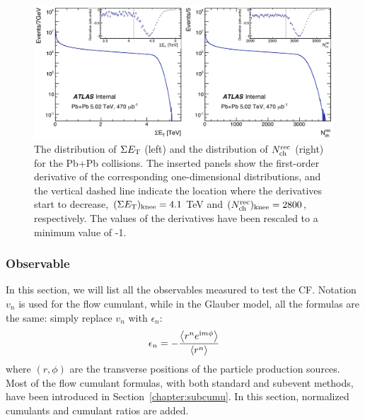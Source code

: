 \begin{figure}[H]
\centering
\includegraphics[width=.95\linewidth]{figs/chapter_centfluc/ATLAS_dis_Et_Nch.png}
\caption{The distribution of $\Sigma E_\text{T}$ (left) and the distribution of $N_\text{ch}^\text{rec}$ (right) for the Pb+Pb collisions. The inserted panels show the first-order derivative of the corresponding one-dimensional distributions, and the vertical dashed line indicate the location where the derivatives start to decrease, $(\Sigma E_\text{T})_\text{knee}=4.1$ TeV and $(N_\text{ch}^\text{rec})_\text{knee}=2800$, respectively. The values of the derivatives have been rescaled to a minimum value of -1.}
\label{fig:centfluc_ATLAS_dis_Et_Nch}
\end{figure}



\subsubsection{Observable}

In this section, we will list all the observables measured to test the CF. Notation $v_n$ is used for the flow cumulant, while in the Glauber model, all the formulas are the same: simply replace $v_n$ with $\epsilon_n$:
\begin{equation}
\epsilon_n = -\frac{\left\langle r^n e^{\text{i}m\phi}\right\rangle}{\left\langle r^n\right\rangle}
\end{equation}
where $(r, \phi)$ are the transverse positions of the particle production sources. Most of the flow cumulant formulas, with both standard and subevent methods, have been introduced in Section~\ref{chapter:subcumu}. In this section, normalized cumulants and cumulant ratios are added.


